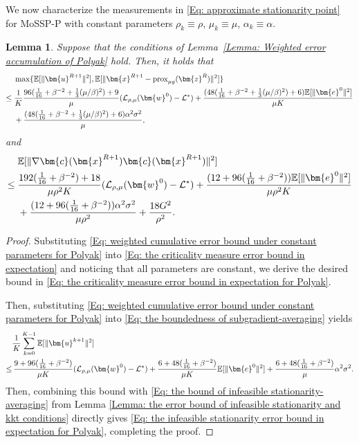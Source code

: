 \documentclass{article}
\theoremstyle{plain}
\newtheorem{lemma}{Lemma}[section]
\theoremstyle{definition}
\theoremstyle{remark}
\newcommand{\EE}{\mathbb{E}}
\newcommand{\prox}{\mathrm{prox}}
\newcommand{\bx}{\bm{x}}
\newcommand{\bc}{\bm{c}}
\newcommand{\be}{\bm{e}}
\newcommand{\bu}{\bm{u}}
\newcommand{\bz}{\bm{z}}
\newcommand{\calL}{\mathcal{L}}
\newcommand{\bw}{\bm{w}}
\newcommand{\sumK}{\sum_{k=0}^{K-1}}
\numberwithin{equation}{section}
\begin{document}
We now characterize the measurements in \eqref{Eq: approximate stationarity point} for MoSSP-P with constant parameters $\rho_{k}\equiv \rho$, $\mu_{k}\equiv \mu$, $\alpha_{k}\equiv \alpha$.
\begin{lemma}
    \label{Lemma: the error bound of the infeasible stationarity in expectation for Polyak}
    Suppose that the conditions of Lemma~\ref{Lemma: Weighted
    error accumulation of Polyak} hold. Then, it holds that
\begin{align}
\label{Eq: the criticality measure error bound in expectation for Polyak}
& \max\{ \EE[\| \bu^{R+1}\|^{2}] ,
\EE [\| \bx^{R+1}- \prox_{\mu g}(\bz^{R})\|^{2}]\} \notag\\
\leq{}&
\frac{1}{K}
\frac{96(\tfrac{1}{16} + \beta^{-2} + \tfrac{1}{3}(\mu/\beta)^{2}) + 9}{\mu}
( \calL_{\rho, \mu}(\bw^{0}) - \calL^{*}) + \frac{(48(\tfrac{1}{16} + \beta^{-2} + \tfrac{1}{3}(\mu/\beta)^{2}) + 6)
\EE [\| \be^{0}\|^{2}]}{\mu K } \notag\\
&+ \frac{(48(\tfrac{1}{16} + \beta^{-2} + \tfrac{1}{3}(\mu/\beta)^{2}) + 6)
\alpha^{2}\sigma^{2}}{\mu},
\end{align}
    and
\begin{align}
\label{Eq: the infeasible stationarity error bound in expectation for Polyak}
&\EE [\|\nabla \bc(\bx^{R+1}) \bc(\bx^{R+1}) \|^{2}]  \notag \\
\leq{}&
\frac{192(\tfrac{1}{16}+ \beta^{-2}) + 18}{\mu\rho^{2}K}
(\calL_{\rho, \mu}(\bw^{0}) - \calL^{*}) + \frac{(12 + 96(\tfrac{1}{16} + \beta^{-2}))\EE [\| \be^{0}\|^{2}]}
{\mu\rho^{2}K } \notag\\
&+ \frac{(12 + 96(\tfrac{1}{16} + \beta^{-2})) \alpha^{2}\sigma^{2}}{\mu\rho^{2}}
+\frac{18G^{2}}{\rho^{2}}.
\end{align}
\end{lemma}
\begin{proof}
    Substituting \eqref{Eq: weighted cumulative error bound under constant parameters for Polyak}
    into \eqref{Eq: the criticality measure error bound in expectation} and noticing that all parameters are constant,
    we derive the desired bound in \eqref{Eq: the criticality measure error bound in expectation for Polyak}.


    Then, substituting \eqref{Eq: weighted cumulative error bound under constant parameters for Polyak}
    into \eqref{Eq: the boundedness of subgradient-averaging} yields
    \begin{align}
             & \frac{1}{K}\sumK \EE[\| \bu^{k+1}\|^{2}] \notag   \\
        \leq&\, \frac{9 + 96(\tfrac{1}{16} + \beta^{-2})}{\mu K}( \calL_{\rho, \mu}(\bw^{0}) - \calL^{*}) + \frac{6 + 48(\tfrac{1}{16} + \beta^{-2})}{\mu K}\EE[\| \be^{0}\|^{2}] +\frac{6 + 48(\tfrac{1}{16} + \beta^{-2})}{\mu}\alpha^{2}\sigma^{2}. \notag
    \end{align}
Then, combining this bound with \eqref{Eq: the bound of infeasible stationarity-averaging}
    from Lemma \ref{Lemma: the error bound of infeasible stationarity and kkt conditions}
    directly gives \eqref{Eq: the infeasible stationarity error bound in expectation for Polyak},
    completing the proof.
\end{proof}
\end{document}
